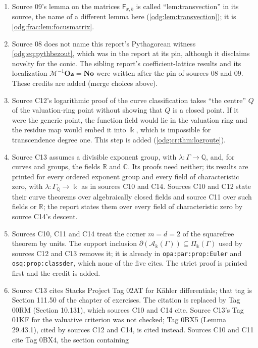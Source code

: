 \documentclass[11pt,oneside]{article}
\numberwithin{equation}{section}
\theoremstyle{definition}
\theoremstyle{remark}
\newcommand{\No}{\mathbf{No}}
\newcommand{\Oz}{\mathbf{Oz}}
\newcommand{\Q}{\mathbb Q}
\newcommand{\R}{\mathbb R}
\newcommand{\C}{\mathbb C}
\newcommand{\replabel}[1]{\nolinkurl{#1}}
\newcommand{\crA}{\mathcal A_\Bbbk(\Gamma)}
\newcommand{\crP}{\Pi_\Bbbk(\Gamma)}
\begin{document}
\begin{enumerate}[leftmargin=*]
with the denominator first, source 09 with the numerator first. One order is
fixed here and both symbols are renamed (\cref{odg:tab:renames}).
\item Source 09's lemma on the matrices $\mathsf F_{x,b}$ is called
``lem:transvection'' in its source, the name of a different lemma here
(\cref{odg:lem:transvection}); it is \cref{odg:frac:lem:focusmatrix}.
\item Source 08 does not name this report's Pythagorean witness
\eqref{odg:eq:pythbezout}, which was in the report at its pin, although it
disclaims novelty for the conic. The sibling report's coefficient-lattice
results and its localization $\mathcal M^{-1}\Oz=\No$ were written after the pin
of sources 08 and 09. These credits are added (merge choices above).
\item Source C12's logarithmic proof of the curve classification takes ``the
centre'' $Q$ of the valuation-ring point without showing that $Q$ is a closed point.
If it were the generic point, the function field would lie in the valuation ring and
the residue map would embed it into $\Bbbk$, which is impossible for transcendence
degree one. This step is added (\cref{odg:cr:thm:logroute}).
\item Source C13 assumes a divisible exponent group, with $\lambda:\Gamma\to\Q$, and,
for curves and groups, the fields $\R$ and $\C$. Its proofs need neither; its results
are printed for every ordered exponent group and every field of characteristic zero,
with $\lambda:\Gamma_\Q\to\Bbbk$ as in sources C10 and C14. Sources C10 and C12 state
their curve theorems over algebraically closed fields and source C11 over such fields
or $\R$; the report states them over every field of characteristic zero by source
C14's descent.
\item Sources C10, C11 and C14 treat the corner $m=d=2$ of the squarefree theorem by
units. The support inclusion $\partial(\crA)\subseteq\crP$ used by sources C12 and C13
removes it; it is already in \replabel{opa:par:prop:Euler} and
\replabel{osq:prop:classder}, which none of the five cites. The strict proof is
printed first and the credit is added.
\item Source C13 cites Stacks Project Tag 02AT for K\"ahler differentials; that tag is
Section 111.50 of the chapter of exercises. The citation is replaced by Tag 00RM
(Section 10.131), which sources C10 and C14 cite. Source C13's Tag 01KF for the
valuative criterion was not checked; Tag 0BX5 (Lemma 29.43.1), cited by sources C12
and C14, is cited instead. Sources C10 and C11 cite Tag 0BX4, the section containing

\end{enumerate}
\end{document}
